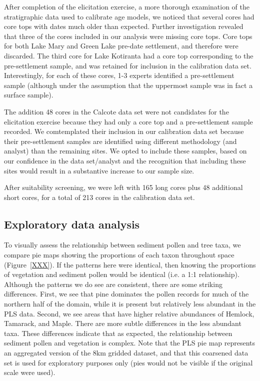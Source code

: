\documentclass[12pt]{article}
\begin{document}
After completion of the elicitation exercise, a more thorough
examination of the stratigraphic data used to calibrate age models, we
noticed that several cores had core tops with dates much older than
expected. Further investigation revealed that three of the cores
included in our analysis were missing core tops. Core tops for both
Lake Mary and Green Lake pre-date settlement, and therefore were
discarded. The third core for Lake Kotiranta had a core top
corresponding to the pre-settlement sample, and was retained for
inclusion in the calibration data set. Interestingly, for each of
these cores, 1-3 experts identified a pre-settlement sample (although
under the assumption that the uppermost sample was in fact a surface
sample).

The addition 48 cores in the Calcote data set were not candidates for
the elicitation exercise because they had only a core top and a
pre-settlement sample recorded. We comtemplated their inclusion in our
calibration data set because their pre-settlement samples are
identified using different methodology (and analyst) than the
remaining sites. We opted to include these samples, based on our
confidence in the data set/analyst and the recognition that including
these sites would result in a substantive increase to our sample size.

After suitability screening, we were left with 165 long cores plus 48
additional short cores, for a total of 213 cores in the calibration data set.

\subsection{Exploratory data analysis}

To visually assess the relationship between sediment pollen and tree
taxa, we compare pie maps showing the proportions of each taxon
throughout space (Figure~\ref{XXX}). If the patterns here were
identical, then knowing the proportions of vegetation and sediment
pollen would be identical (i.e. a 1:1 relationship). Although the
patterns we do see are consistent, there are some striking
differences. First, we see that pine dominates the pollen records for
much of the northern half of the domain, while it is present but
relatively less abundant in the PLS data. Second, we see areas that
have higher relative abundances of Hemlock, Tamarack, and Maple. There
are more subtle differences in the less abundant taxa. These
differences indicate that as expected, the relationship between
sediment pollen and vegetation is complex. Note that the PLS pie map
represents an aggregated version of the 8km gridded dataset, and that
this coarsened data set is used for exploratory purposes only (pies
would not be visible if the original scale were used).
\end{document}
